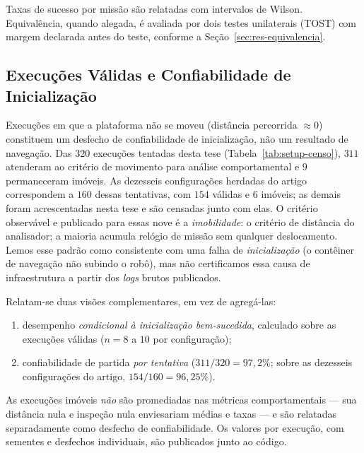 Taxas de sucesso por missão são relatadas com intervalos de Wilson. Equivalência,
quando alegada, é avaliada por dois testes unilaterais (TOST) com margem declarada
antes do teste, conforme a Seção~\ref{sec:res-equivalencia}.

\subsection{Execuções Válidas e Confiabilidade de Inicialização}
\label{sec:res-validade}

Execuções em que a plataforma não se moveu (distância percorrida $\approx 0$)
constituem um desfecho de confiabilidade de inicialização, não um resultado de
navegação. Das $320$ execuções tentadas desta tese (Tabela~\ref{tab:setup-censo}),
$311$ atenderam ao critério de movimento para análise comportamental e $9$
permaneceram imóveis. As dezesseis configurações herdadas do artigo correspondem a
$160$ dessas tentativas, com $154$ válidas e $6$ imóveis; as demais foram acrescentadas
nesta tese e são censadas junto com elas. O critério observável e
publicado para essas nove é a \emph{imobilidade}: o critério de distância do
analisador; a maioria acumula relógio de missão sem qualquer deslocamento. Lemos
esse padrão como consistente com uma falha de \emph{inicialização} (o contêiner de
navegação não subindo o robô), mas não certificamos essa causa de infraestrutura a
partir dos \textit{logs} brutos publicados.

Relatam-se duas visões complementares, em vez de agregá-las:

\begin{enumerate}
    \item desempenho \emph{condicional à inicialização bem-sucedida}, calculado
    sobre as execuções válidas ($n=8$ a $10$ por configuração);
    \item confiabilidade de partida \emph{por tentativa} ($311/320 = 97{,}2\%$; sobre
    as dezesseis configurações do artigo, $154/160 = 96{,}25\%$).
\end{enumerate}

As execuções imóveis \emph{não} são promediadas nas métricas comportamentais --- sua
distância nula e inspeção nula enviesariam médias e taxas --- e são relatadas
separadamente como desfecho de confiabilidade. Os valores por execução, com
sementes e desfechos individuais, são publicados junto ao código.

